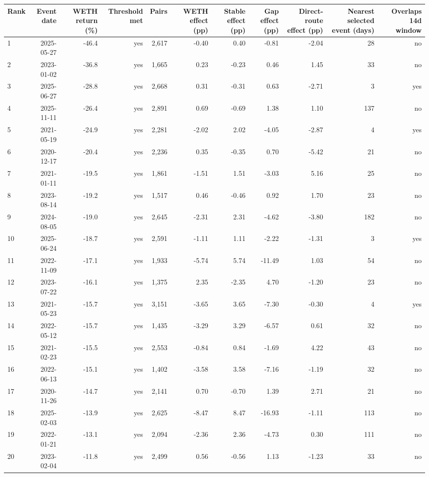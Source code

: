 \begin{tabular}{lrrrrrrrrrr}
\toprule
Rank & Event date & WETH return (\%) & Threshold met & Pairs & WETH effect (pp) & Stable effect (pp) & Gap effect (pp) & Direct-route effect (pp) & Nearest selected event (days) & Overlaps 14d window \\
\midrule
1 & 2025-05-27 & -46.4 & yes & 2,617 & -0.40 & 0.40 & -0.81 & -2.04 & 28 & no \\
2 & 2023-01-02 & -36.8 & yes & 1,665 & 0.23 & -0.23 & 0.46 & 1.45 & 33 & no \\
3 & 2025-06-27 & -28.8 & yes & 2,668 & 0.31 & -0.31 & 0.63 & -2.71 & 3 & yes \\
4 & 2025-11-11 & -26.4 & yes & 2,891 & 0.69 & -0.69 & 1.38 & 1.10 & 137 & no \\
5 & 2021-05-19 & -24.9 & yes & 2,281 & -2.02 & 2.02 & -4.05 & -2.87 & 4 & yes \\
6 & 2020-12-17 & -20.4 & yes & 2,236 & 0.35 & -0.35 & 0.70 & -5.42 & 21 & no \\
7 & 2021-01-11 & -19.5 & yes & 1,861 & -1.51 & 1.51 & -3.03 & 5.16 & 25 & no \\
8 & 2023-08-14 & -19.2 & yes & 1,517 & 0.46 & -0.46 & 0.92 & 1.70 & 23 & no \\
9 & 2024-08-05 & -19.0 & yes & 2,645 & -2.31 & 2.31 & -4.62 & -3.80 & 182 & no \\
10 & 2025-06-24 & -18.7 & yes & 2,591 & -1.11 & 1.11 & -2.22 & -1.31 & 3 & yes \\
11 & 2022-11-09 & -17.1 & yes & 1,933 & -5.74 & 5.74 & -11.49 & 1.03 & 54 & no \\
12 & 2023-07-22 & -16.1 & yes & 1,375 & 2.35 & -2.35 & 4.70 & -1.20 & 23 & no \\
13 & 2021-05-23 & -15.7 & yes & 3,151 & -3.65 & 3.65 & -7.30 & -0.30 & 4 & yes \\
14 & 2022-05-12 & -15.7 & yes & 1,435 & -3.29 & 3.29 & -6.57 & 0.61 & 32 & no \\
15 & 2021-02-23 & -15.5 & yes & 2,553 & -0.84 & 0.84 & -1.69 & 4.22 & 43 & no \\
16 & 2022-06-13 & -15.1 & yes & 1,402 & -3.58 & 3.58 & -7.16 & -1.19 & 32 & no \\
17 & 2020-11-26 & -14.7 & yes & 2,141 & 0.70 & -0.70 & 1.39 & 2.71 & 21 & no \\
18 & 2025-02-03 & -13.9 & yes & 2,625 & -8.47 & 8.47 & -16.93 & -1.11 & 113 & no \\
19 & 2022-01-21 & -13.1 & yes & 2,094 & -2.36 & 2.36 & -4.73 & 0.30 & 111 & no \\
20 & 2023-02-04 & -11.8 & yes & 2,499 & 0.56 & -0.56 & 1.13 & -1.23 & 33 & no \\
\bottomrule
\end{tabular}
